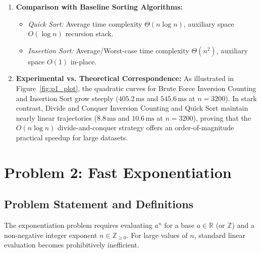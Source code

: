 \documentclass[12pt]{article}
\begin{document}
\begin{enumerate}
    \item \textbf{Comparison with Baseline Sorting Algorithms:}
    \begin{itemize}
        \item \textit{Quick Sort:} Average time complexity $\Theta(n \log n)$, auxiliary space $O(\log n)$ recursion stack.
        \item \textit{Insertion Sort:} Average/Worst-case time complexity $\Theta(n^2)$, auxiliary space $O(1)$ in-place.
    \end{itemize}

    \item \textbf{Experimental vs. Theoretical Correspondence:}
    As illustrated in Figure~\ref{fig:p1_plot}, the quadratic curves for Brute Force Inversion Counting and Insertion Sort grow steeply ($405.2\,\text{ms}$ and $545.6\,\text{ms}$ at $n=3200$). In stark contrast, Divide and Conquer Inversion Counting and Quick Sort maintain nearly linear trajectories ($8.8\,\text{ms}$ and $10.6\,\text{ms}$ at $n=3200$), proving that the $O(n \log n)$ divide-and-conquer strategy offers an order-of-magnitude practical speedup for large datasets.
\end{enumerate}

\newpage

\section{Problem 2: Fast Exponentiation}

\subsection{Problem Statement and Definitions}
The exponentiation problem requires evaluating $a^n$ for a base $a \in \mathbb{R}$ (or $\mathbb{Z}$) and a non-negative integer exponent $n \in \mathbb{Z}_{\ge 0}$. For large values of $n$, standard linear evaluation becomes prohibitively inefficient.
\end{document}
